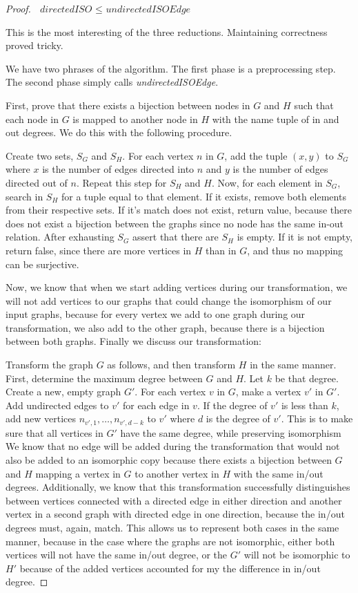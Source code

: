 \documentclass[12pt]{article}
\begin{document}
\begin{proof}{$\textit{ directedISO } \leq \textit{ undirectedISOEdge}$}

This is the most interesting of the three reductions. Maintaining correctness proved tricky.

We have two phrases of the algorithm. The first phase is a preprocessing step. The second phase simply calls \textit{ undirectedISOEdge}.

First, prove that there exists a bijection between nodes in $G$ and $H$ such that each node in $G$ is mapped to another node in $H$ with the name tuple of in and out degrees. We do this with the following procedure.

Create two sets, $S_{G}$ and $S_{H}$. For each vertex $n$ in $G$, add the tuple $(x, y)$ to $S_{G}$ where $x$ is the number of edges directed into $n$ and $y$ is the number of edges directed out of $n$. Repeat this step for $S_{H}$ and $H$. Now, for each element in $S_{G}$, search in $S_{H}$ for a tuple equal to that element. If it exists, remove both elements from their respective sets. If it's match does not exist, return value, because there does not exist a bijection between the graphs since no node has the same in-out relation. After exhausting $S_{G}$ assert that there are $S_{H}$ is empty. If it is not empty, return false, since there are more vertices in $H$ than in $G$, and thus no mapping can be surjective.

Now, we know that when we start adding vertices during our transformation, we will not add vertices to our graphs that could change the isomorphism of our input graphs, because for every vertex we add to one graph during our transformation, we also add to the other graph, because there is a bijection between both graphs. Finally we discuss our transformation:

Transform the graph $G$ as follows, and then transform $H$ in the same manner.
First, determine the maximum degree between $G$ and $H$. Let $k$ be that degree. Create a new, empty graph $G'$. For each vertex $v$ in $G$, make a vertex $v'$ in $G'$. Add undirected edges to $v'$ for each edge in $v$. If the degree of $v'$ is less than $k$, add new vertices $n_{v', 1}, \dots, n_{v', d-k}$ to $v'$ where $d$ is the degree of $v'$. This is to make sure that all vertices in $G'$ have the same degree, while preserving isomorphism We know that no edge will be added during the transformation that would not also be added to an isomorphic copy because there exists a bijection between $G$ and $H$ mapping a vertex in $G$ to another vertex in $H$ with the same in/out degrees. Additionally, we know that this transformation successfully distinguishes between vertices connected with a directed edge in either direction and another vertex in a second graph with directed edge in one direction, because the in/out degrees must, again, match. This allows us to represent both cases in the same manner, because in the case where the graphs are not isomorphic, either both vertices will not have the same in/out degree, or the $G'$ will not be isomorphic to $H'$ because of the added vertices accounted for my the difference in in/out degree.


\end{proof}
\end{document}
